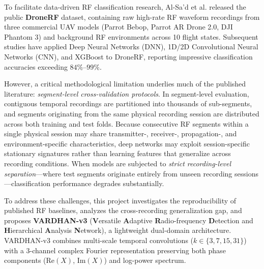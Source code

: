 \documentclass[journal,10pt,twocolumn]{IEEEtran}
\begin{document}
To facilitate data-driven RF classification research, Al-Sa'd et al. \cite{alsad2019rf, allahham2019dronerf} released the public \textbf{DroneRF} dataset, containing raw high-rate RF waveform recordings from three commercial UAV models (Parrot Bebop, Parrot AR Drone 2.0, DJI Phantom 3) and background RF environments across 10 flight states. Subsequent studies \cite{alsad2019rf, allahham2020deep, mo2022deep, medaiyese2021machine, alemadi2020drone, nemer2021rf, zhang2021rf} have applied Deep Neural Networks (DNN), 1D/2D Convolutional Neural Networks (CNN), and XGBoost to DroneRF, reporting impressive classification accuracies exceeding $84\%\text{--}99\%$.

However, a critical methodological limitation underlies much of the published literature: \textit{segment-level cross-validation protocols}. In segment-level evaluation, contiguous temporal recordings are partitioned into thousands of sub-segments, and segments originating from the same physical recording session are distributed across both training and test folds. Because consecutive RF segments within a single physical session may share transmitter-, receiver-, propagation-, and environment-specific characteristics, deep networks may exploit session-specific stationary signatures rather than learning features that generalize across recording conditions. When models are subjected to \textit{strict recording-level separation}---where test segments originate entirely from unseen recording sessions---classification performance degrades substantially.

To address these challenges, this project investigates the reproducibility of published RF baselines, analyzes the cross-recording generalization gap, and proposes \textbf{VARDHAN-v3} (\textbf{V}ersatile \textbf{A}daptive \textbf{R}adio-frequency \textbf{D}etection and \textbf{H}ierarchical \textbf{A}nalysis \textbf{N}etwork), a lightweight dual-domain architecture. VARDHAN-v3 combines multi-scale temporal convolutions ($k \in \{3, 7, 15, 31\}$) with a 3-channel complex Fourier representation preserving both phase components ($\text{Re}(X)$, $\text{Im}(X)$) and log-power spectrum.
\end{document}
